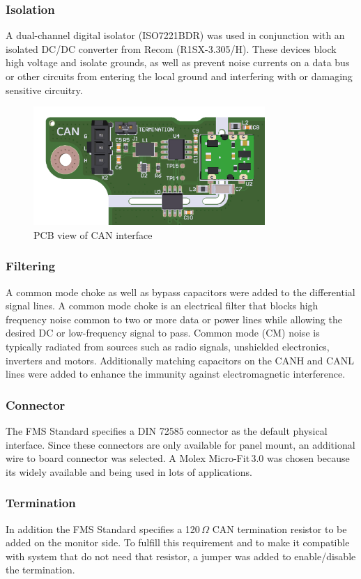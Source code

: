 \subsubsection{Isolation}
A dual-channel digital isolator (ISO7221BDR) was used in conjunction with an isolated DC/DC converter from Recom (R1SX-3.305/H). These devices block high voltage and isolate grounds, as well as prevent noise currents on a data bus or other circuits from entering the local ground and interfering with or damaging sensitive circuitry.

\begin{figure}[h!]
	\centering
	\includegraphics[height=4.5cm]{images/can-pcb}
	\caption{PCB view of CAN interface}
	\label{fig:can-pcb}
\end{figure}

\subsubsection{Filtering}
A common mode choke as well as bypass capacitors were added to the differential signal lines. A common mode choke is an electrical filter that blocks high frequency noise common to two or more data or power lines while allowing the desired DC or low-frequency signal to pass. Common mode (CM) noise is typically radiated from sources such as radio signals, unshielded electronics, inverters and motors. Additionally matching capacitors on the CANH and CANL lines were added to enhance the immunity against electromagnetic interference. 

\subsubsection{Connector}
The FMS Standard specifies a DIN 72585 connector as the default physical interface. Since these connectors are only available for panel mount, an additional wire to board connector was selected. A Molex Micro-Fit\,3.0 was chosen because its widely available and being used in lots of applications.

\subsubsection{Termination}
In addition the FMS Standard specifies a 120\,$\Omega$ CAN termination resistor to be added on the monitor side. To fulfill this requirement and to make it compatible with system that do not need that resistor, a jumper was added to enable/disable the termination.   

